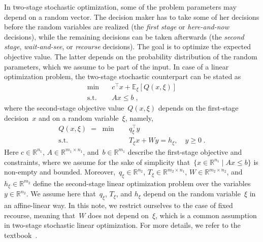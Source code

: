 \documentclass{article}
\newcommand{\R}{\mathbb{R}}
\newcommand{\st}{\text{s.t.}}
\newcommand{\E}{\mathbb{E}}
\begin{document}
In two-stage stochastic optimization, some of the problem parameters
may depend on a random vector. The decision maker has to take some of
her decisions before the random variables are realized (the
\emph{first stage} or \emph{here-and-now} decisions), while the
remaining decisions can be taken afterwards (the \emph{second stage},
\emph{wait-and-see}, or \emph{recourse} decisions). The goal is to
optimize the expected objective value. The latter depends on the
probability distribution of the random parameters, which we assume to
be part of the input. In case of a linear optimization problem, the
two-stage stochastic counterpart can be stated as
\begin{equation}\label{prob:sslp}\tag{SSLP}
\begin{array}{rl}
  \min \quad & c^\top x +\E_\xi[Q(x,\xi)]\\[0.75ex]
  \st \quad & Ax\le b\;,
\end{array}
\end{equation}
where the second-stage objective value~$Q(x,\xi)$ depends on the
first-stage decision~$x$ and on a random variable~$\xi$, namely,
\begin{align*}
  Q(x,\xi) \; = \; \min \quad & q_\xi^\top y\\
  \st \quad & T_\xi x+W y=h_\xi,\quad y\ge 0\;.
\end{align*}
Here $c\in\R^{n_1}$, $A\in\R^{m_1\times n_1}$, and~$b\in\R^{m_1}$
describe the first-stage objective and constraints, where we assume
for the sake of simplicity that~$\{x\in\R^{n_1}\mid Ax\le b\}$ is
non-empty and bounded.  Moreover,~$q_\xi\in\R^{n_2}$,
$T_\xi\in\R^{m_2\times n_1}$, $W\in\R^{m_2\times n_2}$,
and~$h_\xi\in\R^{m_2}$ define the second-stage linear optimization
problem over the variables~$y\in\R^{n_2}$. We assume here
that~$q_\xi$, $T_\xi$, and $h_\xi$ depend on the random variable~$\xi$
in an affine-linear way. In this note, we restrict ourselves to the
case of fixed recourse, meaning that~$W$ does not depend on~$\xi$,
which is a common assumption in two-stage stochastic linear
optimization. For more details, we refer to the
textbook~\cite{Birge11}.
\end{document}
